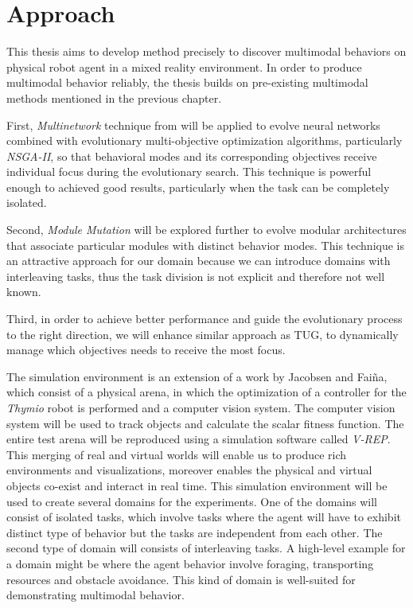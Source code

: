 \documentclass[format=acmsmall, review=false, screen=true]{acmart}
\begin{document}
\section{Approach}

This thesis aims to develop method precisely to discover multimodal behaviors on physical robot agent in a mixed reality environment. In order to produce multimodal behavior reliably, the thesis builds on pre-existing multimodal methods mentioned in the previous chapter.

First, \emph{Multinetwork} technique from \cite{schrum2014evolving} will be applied to evolve neural networks combined with evolutionary multi-objective optimization algorithms, particularly \emph{NSGA-II}, so that behavioral modes and its corresponding objectives receive individual focus during the evolutionary search. This technique is powerful enough to achieved good results, particularly when the task can be completely isolated.

Second, \emph{Module Mutation} will be explored further to evolve modular architectures that associate particular modules with distinct behavior modes. This technique is an attractive approach for our domain because we can introduce domains with interleaving tasks, thus the task division is not explicit and therefore not well known.

Third, in order to achieve better performance and guide the evolutionary process to the right direction, we will enhance similar approach as TUG, to dynamically manage which objectives needs to receive the most focus.

The simulation environment is an extension of a work by Jacobsen and Faiña, which consist of a physical arena, in which the optimization of a controller for the \emph{Thymio} robot is performed and a computer vision system. The computer vision system will be used to track objects and calculate the scalar fitness function. The entire test arena will be reproduced using a simulation software called \emph{V-REP}. This merging of real and virtual worlds will enable us to produce rich environments and visualizations, moreover enables the physical and virtual objects co-exist and interact in real time. This simulation environment will be used to create several domains for the experiments. One of the domains will consist of isolated tasks, which involve tasks where the agent will have to exhibit distinct type of behavior but the tasks are independent from each other. The second type of domain will consists of interleaving tasks. A high-level example for a domain might be where the agent behavior involve foraging, transporting resources and obstacle avoidance. This kind of domain is well-suited for demonstrating multimodal behavior.
\end{document}
